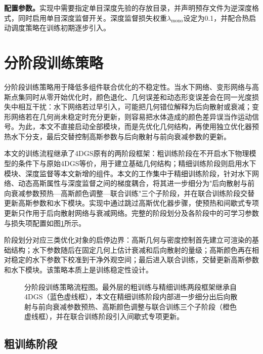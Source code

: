 \textbf{配置参数。}实现中需要指定单目深度先验的存放目录，并声明预存文件为逆深度格式，同时启用单目深度监督开关。深度监督损失权重$\lambda_{\mathrm{mono}}$设定为0.1，并配合热启动调度策略在训练初期逐步引入。

\section{分阶段训练策略}
\label{sec:training-stages}

分阶段训练策略用于降低多组件联合优化的不稳定性。当水下网络、变形网络与高斯点集同时从零开始优化时，颜色退化、几何误差和动态形变误差会在同一光度损失中相互干扰：水下网络若过早引入，可能把几何错位解释为后向散射或衰减；变形网络若在几何尚未稳定时充分更新，则容易把水体造成的颜色差异误当作运动信号。为此，本文不直接启动全部模块，而是先优化几何结构，再使用独立优化器预热水下分支，最后交替控制高斯参数与后向散射与前向衰减参数的更新。

本文的训练流程继承了4DGS原有的两阶段框架：粗训练阶段在不开启水下物理模型的条件下与原始4DGS等价，用于建立基础几何结构；精细训练阶段则启用水下模块、深度监督等本文新增的组件。本文的工作集中于精细训练阶段，针对水下网络、动态高斯属性与深度监督之间的梯度耦合，将其进一步细分为"后向散射与前向衰减参数预热—高斯颜色调整—联合训练"三个子阶段，并在联合训练阶段交替更新高斯参数和水下模块。实现中通过跳过高斯优化器步骤，使预热和间歇式专项更新只作用于后向散射网络与衰减网络。完整的阶段划分及各阶段中的可学习参数与损失项配置如图\ref{fig:training_stages}所示。

阶段划分对应三类优化对象的启停边界：高斯几何与密度控制首先建立可渲染的基础结构；水下参数随后在固定几何上估计衰减和后向散射的量级；高斯颜色再在相对稳定的水下参数下校准到干净外观空间；最后进入联合训练，交替更新高斯参数和水下模块。该策略本质上是训练稳定性设计。

\begin{figure}[htbp]
  \centering
  
  \caption{分阶段训练策略流程图。最外层的粗训练与精细训练两段框架继承自4DGS（蓝色虚线框），本文在精细训练阶段内部进一步细分出后向散射与前向衰减参数预热、高斯颜色调整与联合训练三个子阶段（橙色虚线框），并在联合训练阶段引入间歇式专项更新。}
  \label{fig:training_stages}
\end{figure}

\subsection{粗训练阶段}

